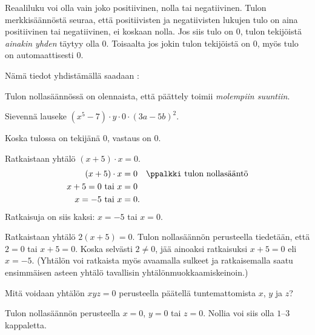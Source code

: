 Reaaliluku voi olla vain joko positiivinen, nolla tai negatiivinen. Tulon merkkisäännöstä seuraa, että positiivisten ja negatiivisten lukujen tulo on aina positiivinen tai negatiivinen, ei koskaan nolla. Jos siis tulo on $0$, tulon tekijöistä \textit{ainakin yhden} täytyy olla $0$. Toisaalta jos jokin tulon tekijöistä on $0$, myös tulo on automaattisesti $0$.

Nämä tiedot yhdistämällä saadaan :


Tulon nollasäännössä on olennaista, että päättely toimii \emph{molempiin suuntiin}.

\begin{esimerkki}
Sievennä lauseke $(x^5-7)\cdot y \cdot 0\cdot(3a-5b)^2$.
    \begin{esimratk}
Koska tulossa on tekijänä $0$, vastaus on $0$.
    \end{esimratk}
\end{esimerkki}

\begin{esimerkki} Ratkaistaan yhtälö $(x+5) \cdot x =0 $.
    \begin{align*}
        (x+5)\cdot x &=0 \quad \ppalkki \text{ tulon nollasääntö} \\
        x +5= 0 \text{ tai } x &=0 \\
        x= -5 \text{ tai } x &=0.
    \end{align*}
    Ratkaisuja on siis kaksi: $x= -5$ tai $x= 0$.
\end{esimerkki}

\newpage %
\begin{esimerkki} Ratkaistaan yhtälö $2(x+5)=0$. Tulon nollasäännön perusteella tiedetään, että $2=0$ tai $x+5=0$. Koska selvästi $2\neq 0$, jää ainoaksi ratkaisuksi $x+5=0$ eli $x=-5$. (Yhtälön voi ratkaista myös avaamalla sulkeet ja ratkaisemalla saatu ensimmäisen asteen yhtälö tavallisin yhtälönmuokkaamiskeinoin.)
\end{esimerkki}

\begin{esimerkki} Mitä voidaan yhtälön $xyz=0$ perusteella päätellä tuntemattomista $x$, $y$ ja $z$?
	\begin{esimratk}
Tulon nollasäännön perusteella $x=0$, $y=0$ tai $z=0$. Nollia voi siis olla $1$--$3$ kappaletta.
	\end{esimratk}
\end{esimerkki}

